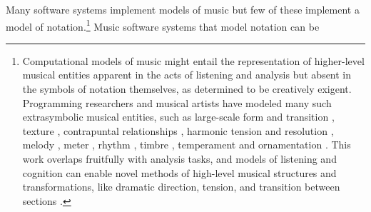 \documentclass{article}
\begin{document}
Many software systems implement models of music but few of these
implement a model of notation.\footnote{Computational models of music might
entail the representation of higher-level musical entities apparent in the acts
of listening and analysis but absent in the symbols of notation themselves, as
determined to be creatively exigent. Programming researchers and musical
artists have modeled many such extrasymbolic musical entities, such as
large-scale form and transition \cite{polansky1991morphological}
\cite{uno1994temporal} \cite{dobrian1995algorithmic} \cite{abrams1999higher}
\cite{Yoo1983}, texture \cite{Horenstein:2004kx}, contrapuntal relationships
\cite{Boenn:2009oq} \cite{Acevedo2005} \cite{Anders:2011kl}
\cite{Balser:1990tg} \cite{Jones:2000hc} \cite{uno1994temporal}
\cite{Bell:1995ij} \cite{farbood2001analysis} \cite{Cope:2002fv}
\cite{Laurson:2005dz} \cite{Polansky:2011fu} \cite{Ebcioglu:1980kl}, harmonic
tension and resolution \cite{Melo2003} \cite{Wiggins1999}
\cite{Foster:1995qa}, melody \cite{Hornel:1993mi} \cite{Smith:1992pi}, meter
\cite{Hamanaka:2005ff}, rhythm \cite{Nauert2007} \cite{Degazio:1996lh}
\cite{Collins:2003bs}, timbre \cite{Xenakis:1991fu} \cite{Creasey:1996ye}
\cite{Osaka2004}, temperament \cite{Seymour:2007qo} \cite{Graf:2006il} and
ornamentation \cite{Ariza:2003zt} \cite{Chico-Topfer:1998jl}. This work
overlaps fruitfully with analysis tasks, and models of listening and cognition
can enable novel methods of high-level musical structures and transformations,
like dramatic direction, tension, and transition between sections
\cite[108]{Collins2009}.} Music software systems that model notation can be
\end{document}
